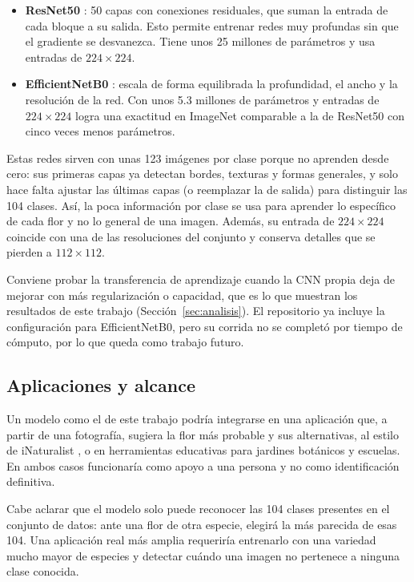 \begin{itemize}
\item \textbf{ResNet50} \autocite{he2016resnet}: 50 capas con conexiones
residuales, que suman la entrada de cada bloque a su salida. Esto permite
entrenar redes muy profundas sin que el gradiente se desvanezca. Tiene unos 25
millones de parámetros y usa entradas de $224\times224$.
\item \textbf{EfficientNetB0} \autocite{tan2019efficientnet}: escala de forma
equilibrada la profundidad, el ancho y la resolución de la red. Con unos 5.3
millones de parámetros y entradas de $224\times224$ logra una exactitud en
ImageNet comparable a la de ResNet50 con cinco veces menos parámetros.
\end{itemize}

Estas redes sirven con unas 123 imágenes por clase porque no aprenden desde
cero: sus primeras capas ya detectan bordes, texturas y formas generales, y
solo hace falta ajustar las últimas capas (o reemplazar la de salida) para
distinguir las 104 clases. Así, la poca información por clase se usa para
aprender lo específico de cada flor y no lo general de una imagen. Además, su
entrada de $224\times224$ coincide con una de las resoluciones del conjunto y
conserva detalles que se pierden a $112\times112$.

Conviene probar la transferencia de aprendizaje cuando la CNN propia deja de
mejorar con más regularización o capacidad, que es lo que muestran los
resultados de este trabajo (Sección~\ref{sec:analisis}). El repositorio ya
incluye la configuración para EfficientNetB0, pero su corrida no se completó
por tiempo de cómputo, por lo que queda como trabajo futuro.

\subsection{Aplicaciones y alcance}

Un modelo como el de este trabajo podría integrarse en una aplicación que, a
partir de una fotografía, sugiera la flor más probable y sus alternativas, al
estilo de iNaturalist \autocite{inaturalist}, o en herramientas educativas para
jardines botánicos y escuelas. En ambos casos funcionaría como apoyo a una
persona y no como identificación definitiva.

Cabe aclarar que el modelo solo puede reconocer las 104 clases presentes en el
conjunto de datos: ante una flor de otra especie, elegirá la más parecida de
esas 104. Una aplicación real más amplia requeriría entrenarlo con una variedad
mucho mayor de especies y detectar cuándo una imagen no pertenece a ninguna
clase conocida.
